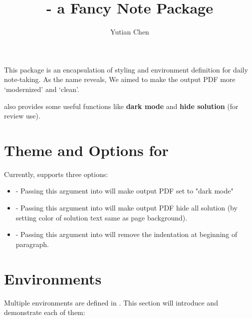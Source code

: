 \documentclass{article}
\title{\code{cleanNote} - a Fancy Note Package}
\author{Yutian Chen}
\begin{document}
    \maketitle
    \tableofcontents
    \newpage

    This package is an encapsulation of styling and environment definition for daily note-taking. As the name reveals, We aimed to make the output PDF more `modernized' and `clean'.

     also provides some useful functions like \textbf{dark mode} and \textbf{hide solution} (for review use).

    \section{Theme and Options for }

\begin{codeblock}[tex]
\usepackage[Dark?, HideSolution?, NoIndent?]{cleanNote}

\usepackage{cleanNote}                     %
\usepackage[Dark]{cleanNote}               %
\usepackage[Dark, HideSolution]{cleanNote} %
\usepackage[NoIndent]{cleanNote}    %
\end{codeblock}

    Currently,  supports three options:

    \begin{itemize}
        \item {} - Passing this argument into  will make output PDF set to "dark mode"
        \item {} - Passing this argument into  will make output PDF hide all solution (by setting color of solution text same as page background).
        \item {} - Passing this argument into  will remove the indentation at beginning of paragraph.
    \end{itemize}

    \section{Environments}

    Multiple environments are defined in . This section will introduce and demonstrate each of them:
\end{document}
